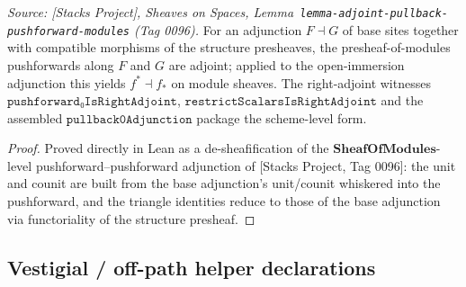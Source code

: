 \begin{lemma}
  \label{lem:pushforward_adjunction}
  \textit{Source: [Stacks Project], Sheaves on Spaces,
  Lemma~\texttt{lemma-adjoint-pullback-pushforward-modules} (Tag 0096).}
  For an adjunction \(F \dashv G\) of base sites together with compatible morphisms of the
  structure presheaves, the presheaf-of-modules pushforwards along \(F\) and \(G\) are
  adjoint; applied to the open-immersion adjunction this yields \(f^{*} \dashv f_{*}\) on
  module sheaves. The right-adjoint witnesses \(\mathtt{pushforward₀IsRightAdjoint}\),
  \(\mathtt{restrictScalarsIsRightAdjoint}\) and the assembled
  \(\mathtt{pullback0Adjunction}\) package the scheme-level form.
\end{lemma}
\begin{proof}
  Proved directly in Lean as a de-sheafification of the \(\mathbf{SheafOfModules}\)-level
  pushforward--pushforward adjunction of [Stacks Project, Tag 0096]: the unit and counit
  are built from the base adjunction's unit/counit whiskered into the pushforward, and
  the triangle identities reduce to those of the base adjunction via functoriality of the
  structure presheaf.
\end{proof}

\subsection{Vestigial / off-path helper declarations}
\label{subsec:tensorobj_vestigial_helpers}

